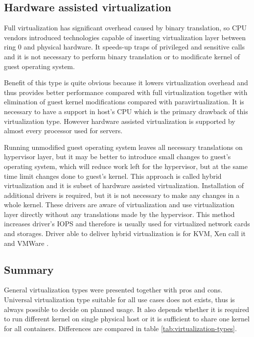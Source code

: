 \subsection{Hardware assisted virtualization}
Full virtualization has significant overhead caused by binary translation, so \Ac{CPU} vendors introduced technologies capable of inserting virtualization layer between ring 0 and physical hardware. It speeds-up traps of privileged and sensitive calls and it is not necessary to perform binary translation or to modificate kernel of guest operating system. 

Benefit of this type is quite obvious because it lowers virtualization overhead and thus provides better performance compared with full virtualization together with elimination of guest kernel modifications compared with paravirtualization. It is necessary to have a support in host's \Ac{CPU} which is the primary drawback of this virtualization type. However hardware assisted virtualization is supported by almost every processor used for servers.

Running unmodified guest operating system leaves all necessary translations on hypervisor layer, but it may be better to introduce small changes to guest's operating system, which will reduce work left for the hypervisor, but at the same time limit changes done to guest's kernel. This approach is called hybrid virtualization and it is subset of hardware assisted virtualization. Installation of additional drivers is required, but it is not necessary to make any changes in a whole kernel. These drivers are aware of virtualization and use virtualization layer directly without any translations made by the hypervisor. This method increases driver's \Ac{IOPS} and therefore is usually used for virtualized network cards and storages. Driver able to deliver hybrid virtualization is  for \Ac{KVM}, Xen call it  and VMWare  .

\subsection{Summary}
General virtualization types were presented together with pros and cons. Universal virtualization type suitable for all use cases does not exists, thus is always possible to decide on planned usage. It also depends whether it is required to run different kernel on single physical host or it is sufficient to share one kernel for all containers. Differences are compared in table \ref{tab:virtualization-types}.

